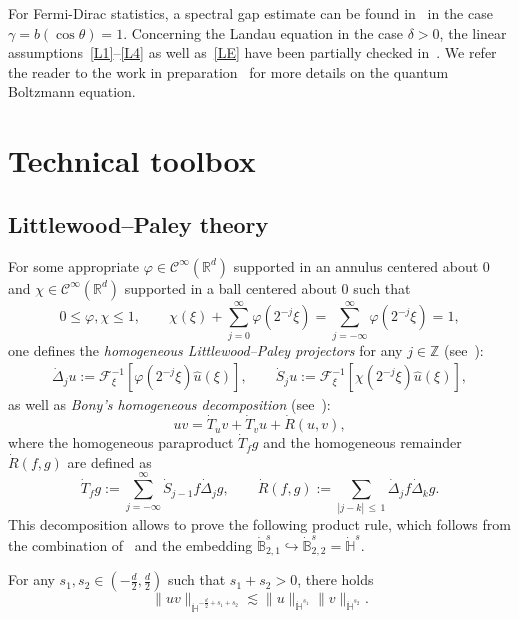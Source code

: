 \documentclass[AHL,Unicode,longabstracts,published]{cedram}
\newcommand{\R}{\mathbb{R}}
\newcommand{\Z}{\mathbb{Z}}
\newcommand{\bbH}{\mathbb{H}}
\newcommand{\bbB}{\mathbb{B}}
\newcommand{\CC}{\mathcal{C}}
\newcommand{\FF}{\mathcal{F}}
\renewcommand*\le{\leqslant}
\begin{document}
For Fermi-Dirac statistics, a spectral gap estimate can be found in~\cite{jiang} in the case $\gamma = b(\cos \theta) = 1$. Concerning the Landau equation in the case $\delta > 0$, the linear assumptions~\eqref{L1}--\eqref{L4} as well as~\eqref{LE} have been partially checked in~\cite{ABL}. We refer the reader to the work in preparation~\cite{GL2023} for more details on the quantum Boltzmann equation.

\section{Technical toolbox}\label{sec:toolbox}

\subsection{Littlewood--Paley theory}\label{scn:littlewood-paley}
For some appropriate $\varphi \in \CC^\infty(\R^d)$ supported in an annulus centered about $0$ and $\chi \in \CC^\infty(\R^d )$ supported in a ball centered about $0$ such that
\[
0 \le \varphi, \chi \le 1, \qquad \chi(\xi) + \sum_{j=0}^\infty \varphi\left(2^{-j} \xi \right) = \sum_{j=-\infty}^\infty \varphi\left(2^{-j} \xi \right) = 1,
\]
one defines the \emph{homogeneous Littlewood--Paley projectors} for any $j \in \Z$ (see~\cite[Section~2.2]{BCD2011}):
\begin{gather*}
\dot{\Delta}_j u := \FF^{-1}_\xi \left[\varphi\left(2^{-j} \xi \right) \widehat{u}(\xi) \right], \qquad \dot{S}_j u := \FF^{-1}_\xi \left[\chi\left(2^{-j} \xi \right) \widehat{u}(\xi) \right],
\end{gather*}
as well as \emph{Bony's homogeneous decomposition} (see~\cite[Section~2.6.1]{BCD2011}):
\[
u v = \dot{T}_u v + \dot{T}_v u + \dot{R}(u, v),
\]
where the homogeneous paraproduct $\dot{T}_f g$ and the homogeneous remainder $\dot{R}(f, g)$ are defined as
\[
\dot{T}_f g := \sum_{j=-\infty}^\infty \dot{S}_{j-1} f \dot{\Delta}_j g, \qquad \dot{R}(f, g) := \sum_{|j - k|\,\le\,1} \dot{\Delta}_j f \dot{\Delta}_k g.
\]
This decomposition allows to prove the following product rule, which follows from the combination of~\cite[Corollary~2.55]{BCD2011} and the embedding $\dot{\bbB}^s_{2, 1} \hookrightarrow \dot{\bbB}^s_{2, 2} = \dot{\bbH}^s$.
\begin{prop}\label{prop:product_homogeneous_sobolev}
For any $s_1, s_2 \in (-\frac{d}{2}, \frac{d}{2})$ such that $s_1 + s_2 > 0$, there holds
\[
\| u v \|_{ \dot{\bbH}^{-\frac{d}{2} + s_1 + s_2} } \lesssim \| u \|_{ \dot{\bbH}^{s_1} } \| v \|_{ \dot{\bbH}^{s_2} }.
\]
\end{prop}
\end{document}
